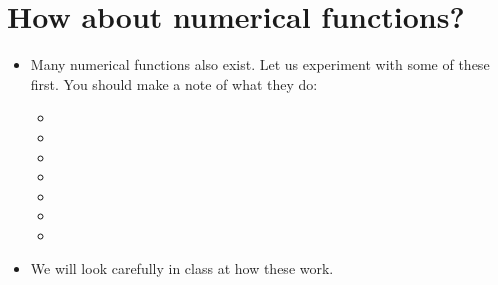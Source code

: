 \documentclass[letterpaper,10pt,english]{sphinxmanual}
\begin{document}
\section{How about numerical functions?}
\label{\detokenize{lecture_notes/lec04_modules_functions1:how-about-numerical-functions}}\begin{itemize}
\item {} 
Many numerical functions also exist. Let us experiment with some of
these first. You should make a note of what they do:
\begin{itemize}
\item {} 

\item {} 

\item {} 

\item {} 

\item {} 

\item {} 

\item {} 

\end{itemize}

\item {} 
We will look carefully in class at how these work.

\end{itemize}
\end{document}
